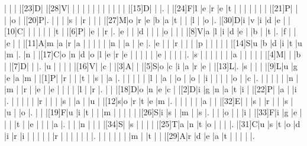 \documentclass[12pt]{article}
\begin{document}
\begin{Puzzle}{22}{22}
  |{}  |{}  |{}  |[23]D|{}  |[28]V|{}  |{}  |{}  |{}  |{}  |{}  |{}  |{}  |{}  |{}  |{}  |{}  |[15]D|{}  |{}  |.
  |{}  |[24]F|l   |e   |r   |e   |t   |{}  |{}  |{}  |{}  |{}  |{}  |{}  |[21]P|{}  |{}  |{}  |o   |{}  |[20]P|.
  |{}  |{}  |{}  |s   |{}  |r   |{}  |{}  |{}  |[27]M|o   |r   |e   |b   |a   |t   |{}  |{}  |l   |{}  |o   |.
  |[30]D|i   |v   |i   |d   |e   |{}  |[10]C|{}  |{}  |{}  |{}  |{}  |{}  |t   |{}  |[6]P|{}  |e   |{}  |r   |.
  |e   |{}  |{}  |d   |{}  |{}  |{}  |o   |{}  |{}  |{}  |[8]V|a   |l   |i   |d   |e   |{}  |b   |{}  |t   |.
  |f   |{}  |{}  |e   |{}  |{}  |[11]A|m   |a   |r   |a   |{}  |{}  |{}  |{}  |{}  |n   |{}  |a   |{}  |e   |.
  |e   |{}  |{}  |r   |{}  |{}  |{}  |p   |{}  |{}  |{}  |{}  |{}  |[14]S|u   |b   |d   |i   |t   |u   |m   |.
  |n   |{}  |[17]C|o   |n   |d   |o   |l   |e   |r   |e   |{}  |{}  |{}  |{}  |{}  |e   |{}  |{}  |{}  |{}  |.
  |s   |{}  |{}  |{}  |{}  |{}  |{}  |a   |{}  |{}  |{}  |{}  |{}  |[4]M|{}  |{}  |b   |{}  |[7]D|{}  |{}  |.
  |u   |{}  |{}  |{}  |{}  |[16]V|{}  |c   |{}  |[3]A|{}  |{}  |[5]S|o   |c   |i   |a   |r   |e   |{}  |[13]L|.
  |s   |{}  |{}  |{}  |[9]L|u   |g   |e   |a   |m   |{}  |[1]P|{}  |r   |{}  |{}  |t   |{}  |s   |{}  |a   |.
  |{}  |{}  |{}  |{}  |{}  |l   |{}  |a   |{}  |o   |{}  |o   |{}  |i   |{}  |{}  |{}  |{}  |o   |{}  |c   |.
  |{}  |{}  |{}  |{}  |{}  |n   |{}  |m   |{}  |r   |{}  |e   |{}  |e   |{}  |{}  |{}  |{}  |l   |{}  |r   |.
  |{}  |{}  |[18]D|o   |n   |e   |c   |{}  |[2]D|i   |g   |n   |a   |t   |i   |{}  |[22]P|{}  |a   |{}  |i   |.
  |{}  |{}  |{}  |{}  |{}  |r   |{}  |{}  |{}  |s   |{}  |a   |{}  |u   |{}  |[12]s|o   |r   |t   |e   |m   |.
  |{}  |{}  |{}  |{}  |{}  |a   |{}  |{}  |[32]E|{}  |{}  |s   |{}  |r   |{}  |{}  |s   |{}  |u   |{}  |o   |.
  |{}  |{}  |[19]F|u   |i   |t   |{}  |{}  |m   |{}  |{}  |{}  |{}  |{}  |[26]S|i   |s   |{}  |m   |{}  |s   |.
  |{}  |{}  |o   |{}  |{}  |i   |{}  |[33]F|i   |g   |e   |{}  |{}  |{}  |t   |{}  |e   |{}  |{}  |{}  |a   |.
  |{}  |{}  |n   |{}  |{}  |{}  |[34]S|{}  |s   |{}  |{}  |{}  |{}  |[25]T|a   |n   |t   |o   |{}  |{}  |{}  |.
  |[31]C|u   |s   |t   |o   |d   |i   |r   |i   |{}  |{}  |{}  |{}  |{}  |r   |{}  |{}  |{}  |{}  |{}  |{}  |.
  |{}  |{}  |{}  |{}  |{}  |{}  |m   |{}  |t   |{}  |{}  |[29]A|r   |d   |e   |a   |t   |{}  |{}  |{}  |{}  |.
\end{Puzzle}
\end{document}
